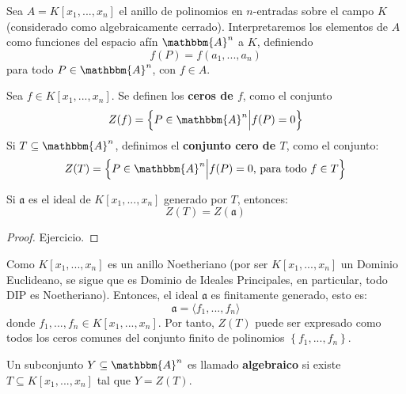 \documentclass[12pt]{report}
\newcounter{it}
\theoremstyle{largebreak}
\newcommand{\bbm}[1]{\ensuremath{\mathbbm{#1}}}
\newcommand{\fk}[1]{\ensuremath{\mathfrak{#1}}}
\newcommand{\gen}[1]{\ensuremath{\langle#1\rangle}}
\begin{document}
    Sea $A=K[x_1,...,x_n]$ el anillo de polinomios en $n$-entradas sobre el campo $K$ (considerado como algebraicamente cerrado). Interpretaremos los elementos de $A$ como funciones del espacio afín $\bbm{A}^n$ a $K$, definiendo
    \begin{equation*}
        f(P)=f(a_1,...,a_n)
    \end{equation*}
    para todo $P\in\bbm{A}^n$, con $f\in A$.

    \begin{mydef}
        Sea $f\in K[x_1,...,x_n]$. Se definen los \textbf{ceros de $f$}, como el conjunto
        \begin{equation*}
            Z(f)=\left\{P\in\bbm{A}^n\Big|f(P)=0 \right\}
        \end{equation*}
        Si $T\subseteq\bbm{A}^n$, definimos el \textbf{conjunto cero de $T$}, como el conjunto:
        \begin{equation*}
            Z(T)=\left\{P\in\bbm{A}^n\Big|f(P)=0\textup{, para todo }f\in T \right\}
        \end{equation*}
    \end{mydef}

    \begin{propo}
        Si $\fk{a}$ es el ideal de $K[x_1,...,x_n]$ generado por $T$, entonces:
        \begin{equation*}
            Z(T)=Z(\fk{a})
        \end{equation*}
    \end{propo}

    \begin{proof}
        Ejercicio.
    \end{proof}

    \begin{obs}
        Como $K[x_1,...,x_n]$ es un anillo Noetheriano (por ser $K[x_1,...,x_n]$ un Dominio Euclideano, se sigue que es Dominio de Ideales Principales, en particular, todo DIP es Noetheriano). Entonces, el ideal $\fk{a}$ es finitamente generado, esto es:
        \begin{equation*}
            \fk{a}=\gen{f_1,...,f_n}
        \end{equation*}
        donde $f_1,...,f_n\in K[x_1,...,x_n]$. Por tanto, $Z(T)$ puede ser expresado como todos los ceros comunes del conjunto finito de polinomios $\left\{f_1,...,f_n \right\}$.
    \end{obs}

    \begin{mydef}
        Un subconjunto $Y\subseteq\bbm{A}^n$ es llamado \textbf{algebraico} si existe $T\subseteq K[x_1,...,x_n]$ tal que $Y=Z(T)$.
    \end{mydef}
\end{document}

